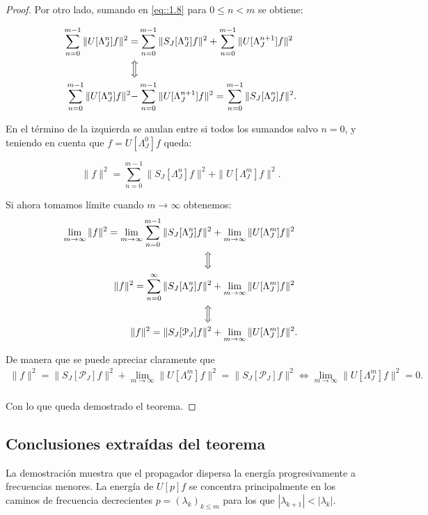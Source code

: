 \begin{proof}
  \noindent Por otro lado, sumando en \eqref{eq::1.8} para $0\leq n < m$ se obtiene:

  \begin{align*}
    \sum_{n=0}^{m-1} \|U[\Lambda_J^n]f\|^2=&\sum_{n=0}^{m-1} \|S_J[\Lambda_J^n]f\|^2 +\sum_{n=0}^{m-1}\|U[\Lambda_J^{n+1}]f\|^2 \\
    \Big\Updownarrow \\
    \sum_{n=0}^{m-1} \|U[\Lambda_J^n]f\|^2 -& \sum_{n=0}^{m-1}\|U[\Lambda_J^{n+1}]f\|^2 = \sum_{n=0}^{m-1} \|S_J[\Lambda_J^n]f\|^2.  \\
  \end{align*}
  
  \noindent En el término de la izquierda se anulan entre si todos los sumandos salvo $n=0$, y teniendo en cuenta que $f=U[\Lambda_J^0]f$ queda:
  
  \begin{equation}
    \|f\|^2=\sum_{n=0}^{m-1} \|S_J[\Lambda_J^n]f\|^2 + \|U[\Lambda_J^m]f\|^2.
  \end{equation}

  \noindent Si ahora tomamos límite cuando $m\rightarrow \infty$ obtenemos: 
  \begin{align*}
    \lim_{m\rightarrow \infty}\|f\|^2 =\lim_{m\rightarrow \infty}\sum_{n=0}^{m-1} \|S_J[\Lambda_J^n]f\|^2 &+ \lim_{m\rightarrow \infty} \|U[\Lambda_J^m]f\|^2  \\
    \Big\Updownarrow \\
    \|f\|^2 =\sum_{n=0}^{\infty} \|S_J[\Lambda_J^n]f\|^2 &+ \lim_{m\rightarrow \infty} \|U[\Lambda_J^m]f\|^2  \\
    \Big\Updownarrow \\
    \|f\|^2 =\|S_J[\mathcal{P}_J]f\|^2 &+ \lim_{m\rightarrow \infty} \|U[\Lambda_J^m]f\|^2.  \\
  \end{align*}

  \noindent De manera que se puede apreciar claramente que  
  \begin{align*}
    \|f\|^2 =\|S_J[\mathcal{P}_J]f\|^2 + \lim_{m\rightarrow \infty} \|U[\Lambda_J^m]f\|^2  = \|S_J[\mathcal{P}_J]f\|^2 \iff \lim_{m\rightarrow \infty} \|U[\Lambda_J^m]f\|^2=0. \\
  \end{align*}

  \noindent Con lo que queda demostrado el teorema. \qedhere
\end{proof}

\subsection{Conclusiones extraídas del teorema}
\noindent La demostración muestra que el propagador dispersa la energía progresivamente a frecuencias menores. La energía de $U[p]f$ se concentra principalmente en los caminos de frecuencia decrecientes $p=(\lambda_k)_{k\leq m}$ para los que $|\lambda_{k+1}|<|\lambda_k|$.


